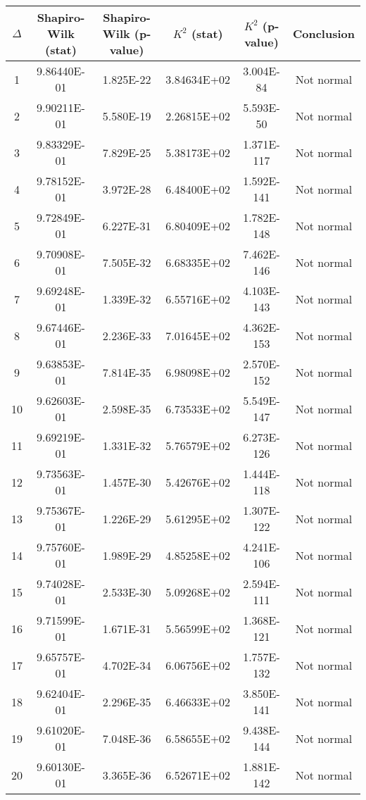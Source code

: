 \begin{table}[h]
	\begin{tabular}{|c|c|c|c|c|c|}
		\hline
		$\Delta$ &  Shapiro-Wilk (stat) & Shapiro-Wilk (p-value) & $K^2$ (stat) & $K^2$ (p-value) & Conclusion\\\hline
		\hline
		1 & 9.86440E-01 & 1.825E-22 & 3.84634E+02 & 3.004E-84 & Not normal\\\hline
		2 & 9.90211E-01 & 5.580E-19 & 2.26815E+02 & 5.593E-50 & Not normal\\\hline
		3 & 9.83329E-01 & 7.829E-25 & 5.38173E+02 & 1.371E-117 & Not normal\\\hline
		4 & 9.78152E-01 & 3.972E-28 & 6.48400E+02 & 1.592E-141 & Not normal\\\hline
		5 & 9.72849E-01 & 6.227E-31 & 6.80409E+02 & 1.782E-148 & Not normal\\\hline
		6 & 9.70908E-01 & 7.505E-32 & 6.68335E+02 & 7.462E-146 & Not normal\\\hline
		7 & 9.69248E-01 & 1.339E-32 & 6.55716E+02 & 4.103E-143 & Not normal\\\hline
		8 & 9.67446E-01 & 2.236E-33 & 7.01645E+02 & 4.362E-153 & Not normal\\\hline
		9 & 9.63853E-01 & 7.814E-35 & 6.98098E+02 & 2.570E-152 & Not normal\\\hline
		10 & 9.62603E-01 & 2.598E-35 & 6.73533E+02 & 5.549E-147 & Not normal\\\hline
		11 & 9.69219E-01 & 1.331E-32 & 5.76579E+02 & 6.273E-126 & Not normal\\\hline
		12 & 9.73563E-01 & 1.457E-30 & 5.42676E+02 & 1.444E-118 & Not normal\\\hline
		13 & 9.75367E-01 & 1.226E-29 & 5.61295E+02 & 1.307E-122 & Not normal\\\hline
		14 & 9.75760E-01 & 1.989E-29 & 4.85258E+02 & 4.241E-106 & Not normal\\\hline
		15 & 9.74028E-01 & 2.533E-30 & 5.09268E+02 & 2.594E-111 & Not normal\\\hline
		16 & 9.71599E-01 & 1.671E-31 & 5.56599E+02 & 1.368E-121 & Not normal\\\hline
		17 & 9.65757E-01 & 4.702E-34 & 6.06756E+02 & 1.757E-132 & Not normal\\\hline
		18 & 9.62404E-01 & 2.296E-35 & 6.46633E+02 & 3.850E-141 & Not normal\\\hline
		19 & 9.61020E-01 & 7.048E-36 & 6.58655E+02 & 9.438E-144 & Not normal\\\hline
		20 & 9.60130E-01 & 3.365E-36 & 6.52671E+02 & 1.881E-142 & Not normal\\\hline

\end{tabular}
\end{table}
